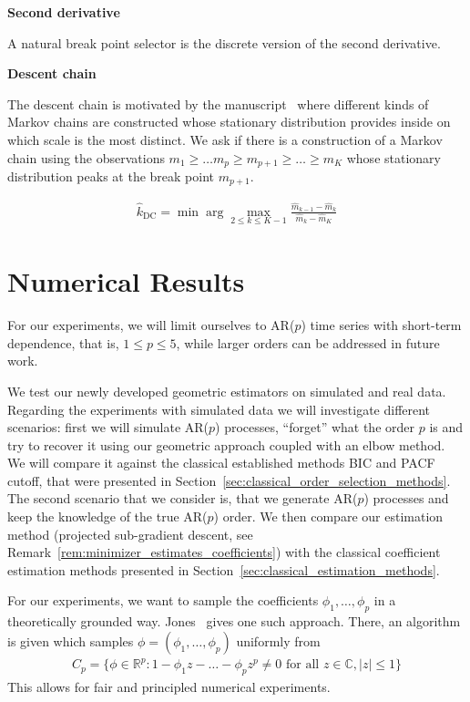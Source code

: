 \textbf{Second derivative}

A natural break point selector is the discrete version of the second derivative. 

\textbf{Descent chain}

The descent chain is motivated by the manuscript~\cite{Baralic2026} where different kinds of Markov chains are constructed whose stationary distribution provides inside on which scale is the most distinct. We ask if there is a construction of a Markov chain using the observations $m_1\ge\dots m_p\ge m_{p+1}\ge\dots\ge m_K$ whose stationary distribution peaks at the break point $m_{p+1}$.

\begin{align*}
    \hat{k}_{\text{DC}}=\min\arg\max_{2\le k\le K-1}\frac{\hat{m}_{k-1}-\hat{m}_k}{\hat{m}_k-\hat{m}_K}
\end{align*}

\section{Numerical Results}

For our experiments, we will limit ourselves to AR($p$) time series with short-term dependence, that is, $1\le p\le 5$, while larger orders can be addressed in future work.

We test our newly developed geometric estimators on simulated and real data. Regarding the experiments with simulated data we will investigate different scenarios: first we will simulate AR($p$) processes, \enquote{forget} what the order $p$ is and try to recover it using our geometric approach coupled with an elbow method. We will compare it against the classical established methods BIC and PACF cutoff, that were presented in Section~\ref{sec:classical_order_selection_methods}. The second scenario that we consider is, that we generate AR($p$) processes and keep the knowledge of the true AR($p$) order. We then compare our estimation method (projected sub-gradient descent, see Remark~\ref{rem:minimizer_estimates_coefficients}) with the classical coefficient estimation methods presented in Section~\ref{sec:classical_estimation_methods}.

For our experiments, we want to sample the coefficients $\phi_1,\dots,\phi_p$ in a theoretically grounded way. Jones~\cite{jones_randomly_1987} gives one such approach. There, an algorithm is given which samples $\phi=(\phi_1,\dots,\phi_p)$ uniformly from
\begin{align*}
    C_p=\{\phi\in\mathbb{R}^p:1-\phi_1z-\dots-\phi_pz^p\ne0\text{ for all }z\in\mathbb{C},|z|\le 1\}
\end{align*}
This allows for fair and principled numerical experiments.


